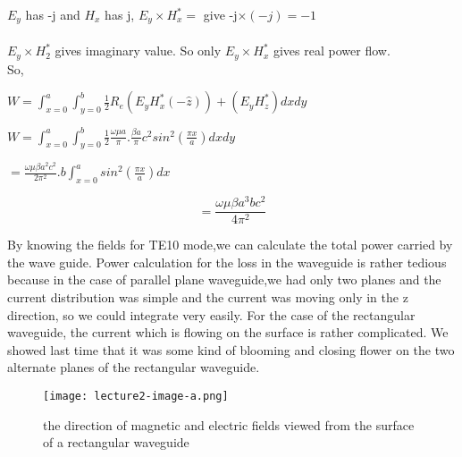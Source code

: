 $E_y$ has -j and $H_x$ has j, $E_y\times H_x^*=$ give -j$\times(-j)=-1$\\\\ 
$E_y\times H_2^*$ gives imaginary value. So only $E_y\times H_x^*$ gives real power flow. \\ So,
\begin{center}
	$W= \int_{x=0}^{a}\int_{y=0}^{b}\frac{1}{2}R_e(E_yH_x^*(-\hat{z}))+(E_yH_z^*)dxdy$
\end{center}

\begin{center}
	$W= \int_{x=0}^{a}\int_{y=0}^{b}\frac{1}{2}\frac{\omega\mu a}{\pi}.\frac{\beta a}{\pi}c^2sin^2(\frac{\pi x}{a})dxdy$
\end{center}
\begin{center}
	$=\frac{\omega\mu\beta a^2c^2}{2\pi^2}.b\int_{x=0}^{a}sin^2(\frac{\pi x}{a})dx$
\end{center}


\begin{equation}
=\frac{\omega\mu\beta a^3bc^2}{4\pi^2}
\end{equation}



By knowing the fields for TE10 mode,we can calculate the total  power  carried by the wave guide. Power calculation for the loss in the waveguide is rather tedious  because in the case of parallel plane waveguide,we had only two planes and the current distribution was simple and the current  was moving only in the z direction, so we could integrate very easily. 
For the case of the rectangular waveguide, the current which is flowing on the surface is rather complicated.
We showed last time that it was some kind of blooming and closing flower on the two alternate planes of the rectangular waveguide. 

\begin{figure}[H]
	\centering
	\texttt{[image: lecture2-image-a.png]}
	\caption{the direction of magnetic and electric fields viewed from the surface of a rectangular waveguide}
\end{figure}

